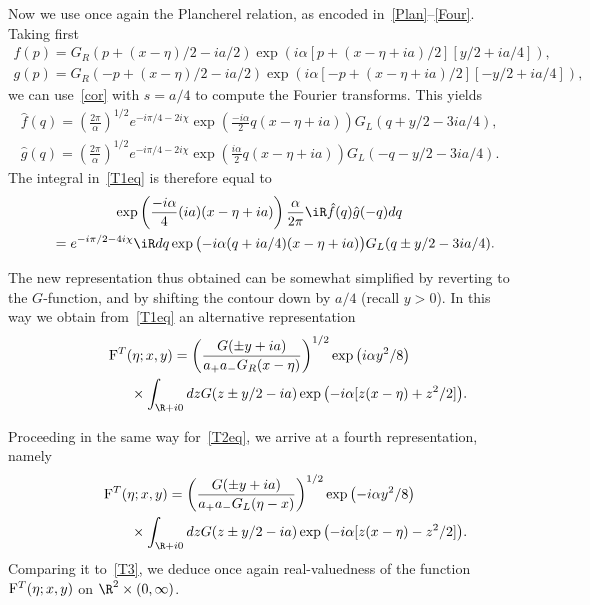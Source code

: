 \documentclass[pdftex]{sigma}
\numberwithin{equation}{section}
\begin{document}
Now we use once again the Plancherel relation, as encoded in~\eqref{Plan}--\eqref{Four}. Taking f\/irst
\begin{gather}
f(p)=G_R(p+(x-\eta)/2-ia/2)\exp(i\alpha [p+(x-\eta+ia)/2][y/2+ia/4]),
\\
g(p)=G_R(-p+(x-\eta)/2-ia/2)\exp(i\alpha [-p+(x-\eta+ia)/2][- y/2+ia/4]),
\end{gather}
we can use~\eqref{cor} with $s=a/4$ to compute the Fourier transforms. This yields
\begin{gather}
\hat{f}(q)=\left(\frac{2\pi}{\alpha}\right)^{1/2}e^{-i\pi/4-2i\chi}
\exp\left( \frac{-i\alpha}{2}q(x-\eta+ia)\right)
G_L(q+y/2-3ia/4),
\\
\hat{g}(q)=\left(\frac{2\pi}{\alpha}\right)^{1/2}e^{-i\pi/4-2i\chi}
\exp\left( \frac{i\alpha}{2}q(x-\eta+ia)\right)
G_L(-q-y/2-3ia/4).
\end{gather}
The integral in~\eqref{T1eq} is therefore equal to
\begin{gather}
  \exp\left( \frac{-i\alpha}{4}(ia)(x-\eta+ia)\right)\frac{\alpha}{2\pi}\iR \hat{f}(q)\hat{g}(-q)dq
  \nonumber \\
\qquad {} =e^{-i\pi/2-4i\chi}\iR dq \exp\big({-}i\alpha(q+ia/4)(x-\eta+ia)\big)G_L(q\pm y/2-3ia/4).
\end{gather}

The new representation thus obtained can be somewhat simplif\/ied by reverting to the $G$-function, and by shifting the contour down by $a/4$ (recall $y>0$). In this way we obtain from~\eqref{T1eq} an alternative representation
\begin{gather}
{\rm F}^T(\eta;x,y)    =    \left(\frac{G(\pm y+ia)}{a_{+}a_-G_R(x-\eta)}\right)^{1/2}\exp\big(i\alpha y^2/8\big)
\nonumber \\
\phantom{{\rm F}^T(\eta;x,y)    =}{}  \times  \int_{\R +i0}dzG(z\pm y/2-ia)\exp\big({-}i\alpha[z(x-\eta)+z^2/2]\big).\label{T3}
\end{gather}

Proceeding in the same way for~\eqref{T2eq}, we arrive at a fourth representation, namely
\begin{gather}
{\rm F}^T(\eta;x,y)    =      \left(\frac{G(\pm y+ia)}{a_+a_-G_L(\eta-x)}\right)^{1/2}\exp\big({-}i\alpha y^2/8\big)
\nonumber \\
\phantom{{\rm F}^T(\eta;x,y)    =}{}   \times \int_{\R +i0} dzG(z\pm y/2-ia)\exp\big({-}i\alpha[z(x-\eta)-z^2/2]\big).\label{T4}
\end{gather}
Comparing it to~\eqref{T3}, we deduce once again real-valuedness of the function ${\rm F}^T(\eta;x,y)$ on $\R^2\times(0,\infty)$.
\end{document}
